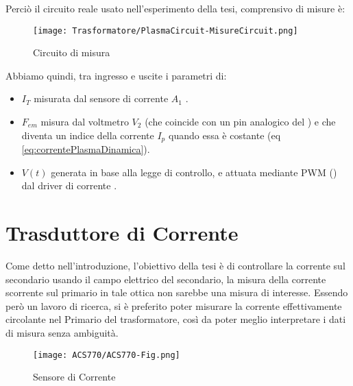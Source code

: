 \newpage
Perciò il circuito reale usato nell'esperimento della tesi, comprensivo di misure è:\\
\begin{figure}[h] \label{fig:circuitoDiMisura}
	\centering
	\texttt{[image: Trasformatore/PlasmaCircuit-MisureCircuit.png]}
	\caption[Circuito reale di misura dell'esperimento]{Circuito di misura}
\end{figure}

Abbiamo quindi, tra ingresso e uscite i parametri di:
\begin{itemize}
	\item $I_T$ misurata dal sensore di corrente $ A_1 $ .
	\item $F_{em}$ misura dal voltmetro $V_2$ (che coincide con un pin analogico del \microControllore) e che diventa un indice della corrente $I_p$ quando essa è costante (eq \ref{eq:correntePlasmaDinamica}).
	\item $V(t)$ generata in base alla legge di controllo, e attuata mediante PWM (\cite{modulazionePWM}) dal driver di corrente .
\end{itemize}


\newpage


\section{Trasduttore di Corrente}\label{CurrentSense}
Come detto nell'introduzione, l'obiettivo della tesi è di controllare la corrente sul secondario usando il campo elettrico del secondario, la misura della corrente scorrente sul primario in tale ottica non sarebbe una misura di interesse. Essendo però un lavoro di ricerca, si è preferito poter misurare la corrente effettivamente circolante nel Primario del trasformatore, così da poter meglio interpretare i dati di misura senza ambiguità.\\
\begin{figure}[h]
	\centering
	\texttt{[image: ACS770/ACS770-Fig.png]}
	\caption[Sensore di Corrente ]{Sensore di Corrente}
\end{figure}
